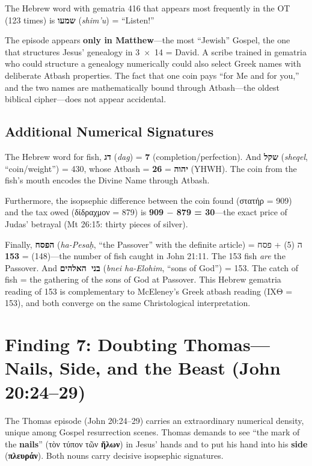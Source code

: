 \documentclass[12pt,a4paper]{article}
\begin{document}
The Hebrew word with gematria 416 that appears most frequently in the OT (123 times) is \textbf{שמעו} (\textit{shim'u}) = ``Listen!''

The episode appears \textbf{only in Matthew}---the most ``Jewish'' Gospel, the one that structures Jesus' genealogy in 3~$\times$~14 = David. A scribe trained in gematria who could structure a genealogy numerically could also select Greek names with deliberate Atbash properties. The fact that one coin pays ``for Me and for you,'' and the two names are mathematically bound through Atbash---the oldest biblical cipher---does not appear accidental.

\subsection{Additional Numerical Signatures}

The Hebrew word for fish, \textbf{דג} (\textit{dag}) = \textbf{7} (completion/perfection). And \textbf{שקל} (\textit{sheqel}, ``coin/weight'') = 430, whose Atbash = \textbf{26} = \textbf{יהוה} (YHWH). The coin from the fish's mouth encodes the Divine Name through Atbash.

Furthermore, the isopsephic difference between the coin found (στατήρ = 909) and the tax owed (δίδραχμον = 879) is \textbf{909 $-$ 879 = 30}---the exact price of Judas' betrayal (Mt 26:15: thirty pieces of silver).

Finally, \textbf{הפסח} (\textit{ha-Pesaḥ}, ``the Passover'' with the definite article) = ה (5) + פסח (148) = \textbf{153}---the number of fish caught in John 21:11. The 153 fish \textit{are} the Passover. And \textbf{בני~האלהים} (\textit{bnei ha-Elohim}, ``sons of God'') = 153. The catch of fish = the gathering of the sons of God at Passover. This Hebrew gematria reading of 153 is complementary to McEleney's Greek atbash reading (ΙΧΘ = 153), and both converge on the same Christological interpretation.

\section{Finding 7: Doubting Thomas---Nails, Side, and the Beast (John 20:24--29)}
\label{sec:thomas}

The Thomas episode (John 20:24--29) carries an extraordinary numerical density, unique among Gospel resurrection scenes. Thomas demands to see ``the mark of the \textbf{nails}'' (τὸν τύπον τῶν \textbf{ἥλων}) in Jesus' hands and to put his hand into his \textbf{side} (\textbf{πλευράν}). Both nouns carry decisive isopsephic signatures.
\end{document}
